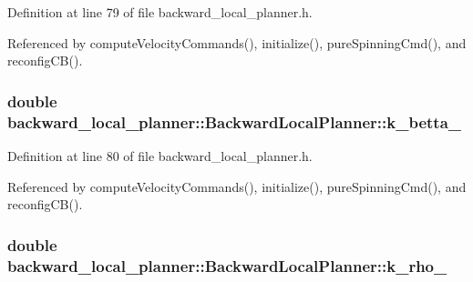 Definition at line 79 of file backward\+\_\+local\+\_\+planner.\+h.



Referenced by compute\+Velocity\+Commands(), initialize(), pure\+Spinning\+Cmd(), and reconfig\+C\+B().

\subsubsection[{\texorpdfstring{k\+\_\+betta\+\_\+}{k_betta_}}]{\setlength{\rightskip}{0pt plus 5cm}double backward\+\_\+local\+\_\+planner\+::\+Backward\+Local\+Planner\+::k\+\_\+betta\+\_\+\hspace{0.3cm}{\ttfamily [private]}}\hypertarget{classbackward__local__planner_1_1BackwardLocalPlanner_a655def0b0657ac145737cd72229ad82a}{}\label{classbackward__local__planner_1_1BackwardLocalPlanner_a655def0b0657ac145737cd72229ad82a}


Definition at line 80 of file backward\+\_\+local\+\_\+planner.\+h.



Referenced by compute\+Velocity\+Commands(), initialize(), pure\+Spinning\+Cmd(), and reconfig\+C\+B().

\subsubsection[{\texorpdfstring{k\+\_\+rho\+\_\+}{k_rho_}}]{\setlength{\rightskip}{0pt plus 5cm}double backward\+\_\+local\+\_\+planner\+::\+Backward\+Local\+Planner\+::k\+\_\+rho\+\_\+\hspace{0.3cm}{\ttfamily [private]}}\hypertarget{classbackward__local__planner_1_1BackwardLocalPlanner_a4060acf69c2590984eb87d8e04a82699}{}\label{classbackward__local__planner_1_1BackwardLocalPlanner_a4060acf69c2590984eb87d8e04a82699}


